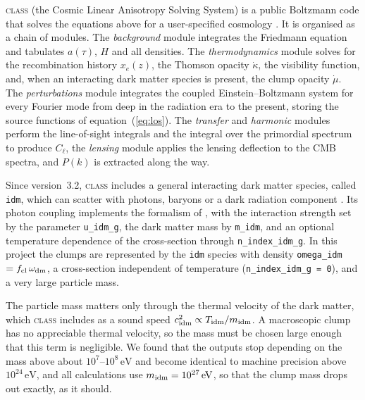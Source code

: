 \documentclass[11pt,a4paper]{article}
\newcommand{\cl}{\mathrm{cl}}
\begin{document}
\textsc{class} (the Cosmic Linear Anisotropy Solving System) is a public Boltzmann code that solves the equations above for a user-specified cosmology \citep{Lesgourgues2011, Blas2011}. It is organised as a chain of modules. The \emph{background} module integrates the Friedmann equation and tabulates $a(\tau)$, $H$ and all densities. The \emph{thermodynamics} module solves for the recombination history $x_e(z)$, the Thomson opacity $\dot\kappa$, the visibility function, and, when an interacting dark matter species is present, the clump opacity $\dot\mu$. The \emph{perturbations} module integrates the coupled Einstein--Boltzmann system for every Fourier mode from deep in the radiation era to the present, storing the source functions of equation~(\ref{eq:los}). The \emph{transfer} and \emph{harmonic} modules perform the line-of-sight integrals and the integral over the primordial spectrum to produce $C_\ell$, the \emph{lensing} module applies the lensing deflection to the CMB spectra, and $P(k)$ is extracted along the way.

Since version~3.2, \textsc{class} includes a general interacting dark matter species, called \texttt{idm}, which can scatter with photons, baryons or a dark radiation component \citep{Becker2021}. Its photon coupling implements the formalism of \citet{StadlerBoehm2018}, with the interaction strength set by the parameter \texttt{u\_idm\_g}, the dark matter mass by \texttt{m\_idm}, and an optional temperature dependence of the cross-section through \texttt{n\_index\_idm\_g}. In this project the clumps are represented by the \texttt{idm} species with density \texttt{omega\_idm} $= f_\cl\,\omega_{\rm dm}$, a cross-section independent of temperature (\texttt{n\_index\_idm\_g = 0}), and a very large particle mass.

The particle mass matters only through the thermal velocity of the dark matter, which \textsc{class} includes as a sound speed $c^2_{\rm idm} \propto T_{\rm idm}/m_{\rm idm}$. A macroscopic clump has no appreciable thermal velocity, so the mass must be chosen large enough that this term is negligible. We found that the outputs stop depending on the mass above about $10^{7}$--$10^{8}\,\mathrm{eV}$ and become identical to machine precision above $10^{24}\,\mathrm{eV}$, and all calculations use $m_{\rm idm} = 10^{27}\,\mathrm{eV}$, so that the clump mass drops out exactly, as it should.
\end{document}
